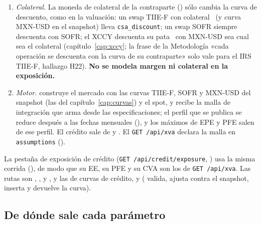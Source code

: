 \begin{sloppypar}
\begin{enumerate}
        (el inicial sólo si el swap empieza en la fecha de valuación o después). Se transcriben a las especificaciones en
         y , y se reúnen en
        .
  \item \emph{Colateral.} La moneda de colateral de la contraparte
        () sólo cambia la curva de descuento, como en la valuación: un
        swap TIIE-F con colateral \USD\ (y curva MXN-USD en el snapshot) lleva \texttt{csa\_discount}; un swap SOFR siempre
        descuenta con SOFR; el XCCY descuenta su pata \MXN\ con MXN-USD sea cual sea el colateral
        (capítulo~\ref{cap:xccy}; la frase de la Metodología «cada operación se descuenta con la curva de su contraparte» solo
        vale para el IRS TIIE-F, hallazgo H22). \textbf{No se modela margen ni colateral en la exposición.}
  \item \emph{Motor.}  construye el mercado con las curvas TIIE-F, SOFR y MXN-USD
        del snapshot (las del capítulo~\ref{cap:curvas}) y el spot, y recibe la malla de integración que arma
         desde las especificaciones; el perfil que se publica se reduce
        después a las fechas mensuales (), y los máximos de EPE y PFE salen de ese perfil. El
        crédito sale de  y . El
        \texttt{GET /api/xva} declara la malla en \texttt{assumptions} ().
\end{enumerate}
La pestaña de exposición de crédito (\texttt{GET /api/credit/exposure},
) usa la misma corrida (), de
modo que su EE, su PFE y su CVA son los de \texttt{GET /api/xva}. Las rutas son
, ,
 y , y las de curvas de
crédito,  y
 (
valida, ajusta contra el snapshot, inserta y devuelve la curva).
\end{sloppypar}

\subsection{De dónde sale cada parámetro}\label{sec:cap14-parametros}

